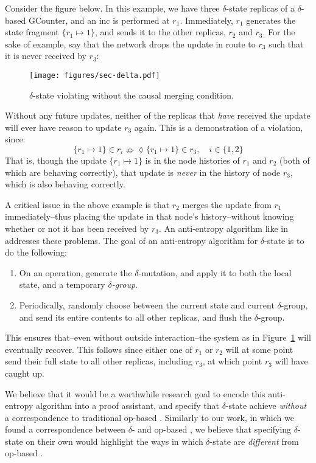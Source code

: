 Consider the figure below. In this example, we have three $\delta$-state \CRDT
replicas of a $\delta$-based GCounter, and an \textsf{inc} is performed at
$r_1$. Immediately, $r_1$ generates the state fragment $\{ r_1 \mapsto 1 \}$,
and sends it to the other replicas, $r_2$ and $r_3$. For the sake of example,
say that the network drops the update in route to $r_3$ such that it is never
received by $r_3$:

\begin{figure}[H]
  \centering
  \texttt{[image: figures/sec-delta.pdf]}
  \caption{$\delta$-state \CRDTs violating \SEC without the causal merging
    condition.}
  \label{fig:delta-sec-violation}
\end{figure}

Without any future updates, neither of the replicas that \emph{have} received
the update will ever have reason to update $r_3$ again. This is a demonstration
of a \SEC violation, since:
\[
  \{ r_1 \mapsto 1 \} \in r_i \nRightarrow \lozenge \{ r_1 \mapsto 1 \} \in r_3,
  \quad i \in \{ 1, 2 \}
\]
That is, though the update $\{ r_1 \mapsto 1 \}$ is in the node histories of
$r_1$ and $r_2$ (both of which are behaving correctly), that update is
\emph{never} in the history of node $r_3$, which is also behaving correctly.

A critical issue in the above example is that $r_2$ merges the update from $r_1$
immediately--thus placing the update in that node's history--without knowing
whether or not it has been received by $r_3$. An anti-entropy algorithm like
in~\citet{almedia18} addresses these problems. The goal of an anti-entropy
algorithm for $\delta$-state \CRDTs is to do the following:
\begin{enumerate}
  \item On an operation, generate the $\delta$-mutation, and apply it to both
    the local state, and a temporary \emph{$\delta$-group}.
  \item Periodically, randomly choose between the current state and current
    $\delta$-group, and send its entire contents to all other replicas, and
    flush the $\delta$-group.
\end{enumerate}
This ensures that--even without outside interaction--the system as in
Figure~\ref{fig:delta-sec-violation} will eventually recover. This follows since
either one of $r_1$ or $r_2$ will at some point send their full state to all
other replicas, including $r_3$, at which point $r_3$ will have caught up.

We believe that it would be a worthwhile research goal to encode this
anti-entropy algorithm into a proof assistant, and specify that $\delta$-state
\CRDTs achieve \SEC \emph{without} a correspondence to traditional op-based
\CRDTs. Similarly to our work, in which we found a correspondence between
$\delta$- and op-based \CRDTs, we believe that specifying $\delta$-state \CRDTs
on their own would highlight the ways in which $\delta$-state \CRDTs are
\emph{different} from op-based \CRDTs.

